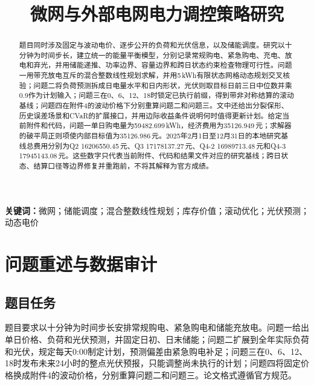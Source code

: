 \documentclass[UTF8,12pt,a4paper]{ctexart}
\title{微网与外部电网电力调控策略研究}
\author{}
\date{}
\newcommand{\keywords}[1]{\par\noindent\textbf{关键词：}#1}
\begin{document}
\maketitle

\begin{abstract}
题目同时涉及固定与波动电价、逐步公开的负荷和光伏信息，以及储能调度。研究以十分钟为时间步长，建立统一的能量平衡模型，分别记录常规购电、紧急购电、充电、放电和弃光，并用储能递推、功率边界、容量边界和跨日状态约束检查物理可行性。问题一用带充放电互斥的混合整数线性规划求解，并用5\,kWh有限状态网格动态规划交叉核验；问题二将负荷预测拆成日电量水平和日内形状，光伏则取目标日前三日中位数并乘0.9作为计划输入；问题三在0、6、12、18时锁定已执行前缀，得到带非对称结算的滚动基线；问题四在附件4的波动价格下分别重算问题二和问题三。文中还给出分裂保形、历史误差场景和CVaR的扩展接口，并用边际收益条件说明何时值得更新计划。给定当前附件和代码，问题一单日购电量为59482.699\,kWh，经济费用为35126.949\,元；求解器的破平局正则项使内部目标值为35126.986\,元。2025年2月1日至12月31日的本地研究基线总费用分别为Q2 16206550.45\,元、Q3 17178137.27\,元、Q4-2 16989713.48\,元和Q4-3 17945143.08\,元。这些数字只代表当前附件、代码和结果文件对应的研究基线；跨日状态、结算口径等边界修复并重跑前，不将其解释为官方成绩。
\end{abstract}
\keywords{微网；储能调度；混合整数线性规划；库存价值；滚动优化；光伏预测；动态电价}
\clearpage

\section{问题重述与数据审计}
\subsection{题目任务}
题目要求以十分钟为时间步长安排常规购电、紧急购电和储能充放电。问题一给出单日价格、负荷和光伏预测，并固定日初、日末储能；问题二扩展到全年实际负荷和光伏，规定每天0:00制定计划，预测偏差由紧急购电补足；问题三在0、6、12、18时发布未来24小时的整点光伏预报，只能调整尚未执行的计划；问题四将固定价格换成附件4的波动价格，分别重算问题二和问题三。论文格式遵循官方规范\cite{cumcm}。
\end{document}
